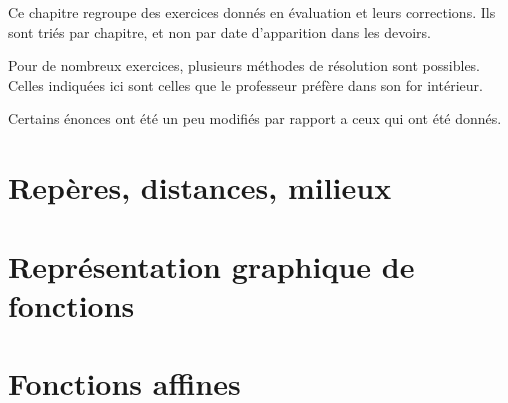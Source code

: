 
\begin{center}
    Ce chapitre regroupe des exercices donnés en évaluation et leurs corrections. Ils sont triés par chapitre, et non par date d'apparition dans les devoirs.

    Pour de nombreux exercices, plusieurs méthodes de résolution sont possibles. Celles indiquées ici sont celles que le professeur préfère dans son for intérieur.    
\end{center}
Certains énonces ont été un peu modifiés par rapport a ceux qui ont été donnés.

\section{Repères, distances, milieux}


\section{Représentation graphique de fonctions}


\section{Fonctions affines}

\vspace{2cm}


